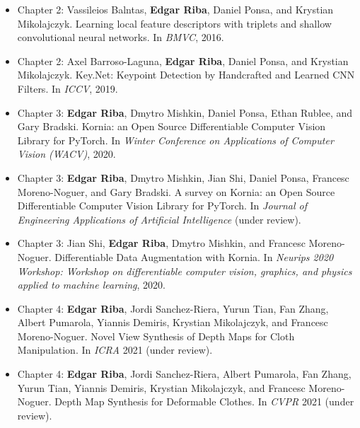 \begin{itemize}
    \item Chapter 2: Vassileios Balntas, \textbf{Edgar Riba}, Daniel Ponsa, and Krystian  Mikolajczyk. Learning local feature descriptors with triplets and shallow convolutional neural networks. In \textit{BMVC}, 2016.
    \item Chapter 2: Axel Barroso-Laguna, \textbf{Edgar Riba}, Daniel Ponsa, and Krystian Mikolajczyk. Key.Net: Keypoint Detection by Handcrafted and Learned CNN Filters. In \textit{ICCV}, 2019.
    \item Chapter 3: \textbf{Edgar Riba}, Dmytro Mishkin, Daniel Ponsa, Ethan Rublee, and Gary Bradski. Kornia: an Open Source Differentiable Computer Vision Library for PyTorch. In \textit{Winter Conference on Applications of Computer Vision (WACV)}, 2020.
    \item Chapter 3: \textbf{Edgar Riba}, Dmytro Mishkin, Jian Shi, Daniel Ponsa, Francesc Moreno-Noguer, and  Gary Bradski. A survey on Kornia: an Open Source Differentiable Computer Vision Library for PyTorch. In \textit{Journal of Engineering Applications of Artificial Intelligence} (under review).
    \item Chapter 3: Jian Shi, \textbf{Edgar Riba}, Dmytro Mishkin, and Francesc Moreno-Noguer. Differentiable Data Augmentation with Kornia. In \textit{Neurips 2020 Workshop: Workshop on differentiable computer vision, graphics, and physics applied to machine learning}, 2020.
    \item Chapter 4: \textbf{Edgar Riba}, Jordi Sanchez-Riera, Yurun Tian, Fan Zhang, Albert Pumarola, Yiannis Demiris, Krystian Mikolajczyk, and Francesc Moreno-Noguer. Novel View Synthesis of Depth Maps for Cloth Manipulation. In \textit{ICRA} 2021 (under review).
    \item Chapter 4: \textbf{Edgar Riba}, Jordi Sanchez-Riera, Albert Pumarola, Fan Zhang, Yurun Tian, Yiannis Demiris, Krystian Mikolajczyk, and Francesc Moreno-Noguer. Depth Map Synthesis for Deformable Clothes. In \textit{CVPR} 2021 (under review).
\end{itemize}